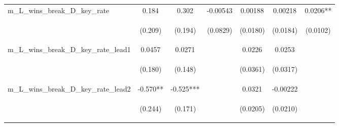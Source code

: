 \begin{tabular}{lcccccc}
m\_L\_wins\_break\_D\_key\_rate & 0.184 & 0.302 & -0.00543 & 0.00188 & 0.00218 & 0.0206** \\
\vspace{4pt} & \begin{footnotesize}(0.209)\end{footnotesize} & \begin{footnotesize}(0.194)\end{footnotesize} & \begin{footnotesize}(0.0829)\end{footnotesize} & \begin{footnotesize}(0.0180)\end{footnotesize} & \begin{footnotesize}(0.0184)\end{footnotesize} & \begin{footnotesize}(0.0102)\end{footnotesize} \\
m\_L\_wins\_break\_D\_key\_rate\_lead1 & 0.0457 & 0.0271 &  & 0.0226 & 0.0253 &  \\
\vspace{4pt} & \begin{footnotesize}(0.180)\end{footnotesize} & \begin{footnotesize}(0.148)\end{footnotesize} & \begin{footnotesize}\end{footnotesize} & \begin{footnotesize}(0.0361)\end{footnotesize} & \begin{footnotesize}(0.0317)\end{footnotesize} & \begin{footnotesize}\end{footnotesize} \\
m\_L\_wins\_break\_D\_key\_rate\_lead2 & -0.570** & -0.525*** &  & 0.0321 & -0.00222 &  \\
\vspace{4pt} & \begin{footnotesize}(0.244)\end{footnotesize} & \begin{footnotesize}(0.171)\end{footnotesize} & \begin{footnotesize}\end{footnotesize} & \begin{footnotesize}(0.0205)\end{footnotesize} & \begin{footnotesize}(0.0210)\end{footnotesize} & \begin{footnotesize}\end{footnotesize} \\

\end{tabular}
